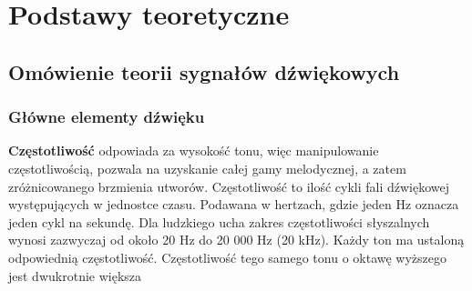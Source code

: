 \chapter{Podstawy teoretyczne}
\vspace{-25pt}
\section{Omówienie teorii sygnałów dźwiękowych}
\subsection{Główne elementy dźwięku}

\textbf{Częstotliwość} odpowiada za wysokość tonu, więc manipulowanie częstotliwością, pozwala na uzyskanie całej gamy melodycznej, a zatem zróżnicowanego brzmienia utworów. Częstotliwość to ilość cykli fali dźwiękowej występujących w jednostce czasu. Podawana w hertzach, gdzie jeden Hz oznacza jeden cykl na sekundę. Dla ludzkiego ucha zakres częstotliwości słyszalnych wynosi zazwyczaj od około 20 Hz do 20 000 Hz (20 kHz). Każdy ton ma ustaloną odpowiednią częstotliwość. Częstotliwość tego samego tonu o oktawę wyższego jest dwukrotnie większa

